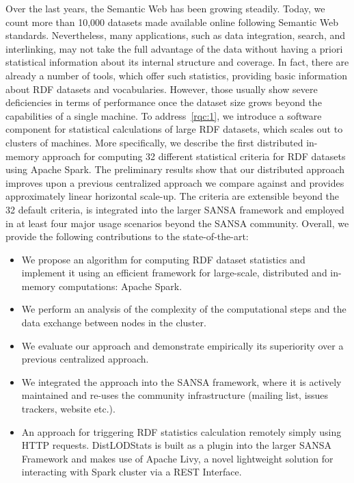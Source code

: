 Over the last years, the Semantic Web has been growing steadily. 
Today, we count more than 10,000 datasets made available online following Semantic Web standards.
Nevertheless, many applications, such as data integration, search, and interlinking, may not take the full advantage of the data without having a priori statistical information about its internal structure and coverage.
In fact, there are already a number of tools, which offer such statistics, providing basic information about \gls{RDF} datasets and vocabularies.
However, those usually show severe deficiencies in terms of performance once the dataset size grows beyond the capabilities of a single machine.
To address~\ref{rqc:1}, we introduce a software component for statistical calculations of large \gls{RDF} datasets, which scales out to clusters of machines.
More specifically, we describe the first distributed in-memory approach for computing 32 different statistical criteria for \gls{RDF} datasets using Apache Spark.
The preliminary results show that our distributed approach improves upon a previous centralized approach we compare against and provides approximately linear horizontal scale-up. 
The criteria are extensible beyond the 32 default criteria, is integrated into the larger SANSA framework and employed in at least four major usage scenarios beyond the SANSA community.
Overall, we provide the following contributions to the state-of-the-art:

\begin{itemize}
    \item We propose an algorithm for computing \gls{RDF} dataset statistics and implement it using an efficient framework for large-scale, distributed and in-memory computations: Apache Spark.
    \item We perform an analysis of the complexity of the computational steps and the data exchange between nodes in the cluster. 
    \item We evaluate our approach and demonstrate empirically its superiority over a previous centralized approach.
    \item We integrated the approach into the SANSA framework, where it is actively maintained and re-uses the community infrastructure (mailing list, issues trackers, website etc.).
    \item An approach for triggering \gls{RDF} statistics calculation remotely simply using HTTP requests. 
    DistLODStats is built as a plugin into the larger SANSA Framework and makes use of Apache Livy, a novel lightweight solution for interacting with Spark cluster via a REST Interface.
\end{itemize}


